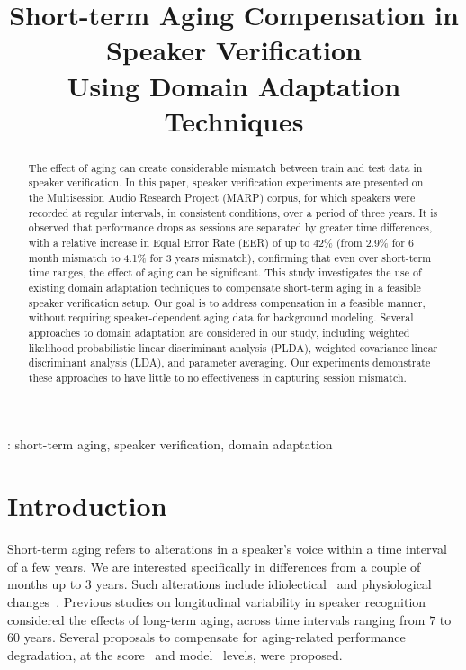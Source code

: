 \documentclass[a4paper]{article}
\title{Short-term Aging Compensation in Speaker Verification\\Using Domain Adaptation Techniques}
\begin{document}
  \maketitle
  \begin{abstract}
The effect of aging can create considerable mismatch between train and test data in speaker verification. In this paper, speaker verification experiments are presented on the Multisession Audio Research Project (MARP) corpus, for which speakers were recorded at regular intervals, in consistent conditions, over a period of three years. It is observed that performance drops as sessions are separated by greater time differences, with a relative increase in Equal Error Rate (EER) of up to 42\% (from 2.9\% for 6 month mismatch to 4.1\% for 3 years mismatch), confirming that even over short-term time ranges, the effect of aging can be significant. This study investigates the use of existing domain adaptation techniques to compensate short-term aging in a feasible speaker verification setup. Our goal is to address compensation in a feasible manner, without requiring speaker-dependent aging data for background modeling. Several approaches to domain adaptation are considered in our study, including weighted likelihood probabilistic linear discriminant analysis (PLDA), weighted covariance linear discriminant analysis (LDA), and parameter averaging. Our experiments demonstrate these approaches to have little to no effectiveness in capturing session mismatch.
  \end{abstract}
  : short-term aging, speaker verification, domain adaptation

\section{Introduction}

Short-term aging refers to alterations in a speaker's voice within a time interval of a few years. We are interested specifically in differences from a couple of months up to $3$ years. Such alterations include idiolectical~\cite{paper3,paper4} and physiological changes~\cite{paper5,paper6}. Previous studies on longitudinal variability in speaker recognition~\cite{paper7, paper9,paper10,paper11} considered the effects of long-term aging, across time intervals ranging from $7$ to $60$ years. Several proposals to compensate for aging-related performance degradation, at the score~\cite{paper11} and model~\cite{paper10} levels, were proposed. 
\end{document}

